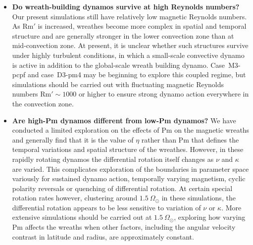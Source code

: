 \begin{itemize}
  \item \textbf{Do wreath-building dynamos survive at high Reynolds  numbers?}  
    Our present simulations still have relatively low
    magnetic Reynolds numbers.  As Rm$'$ is increased, wreathes become
    more complex in spatial and temporal structure and are generally
    stronger in the lower convection zone than at mid-convection
    zone.  At present, it is unclear whether such structures survive
    under highly turbulent conditions, in which a small-scale convective
    dynamo is active in addition to the global-scale wreath building
    dynamo.  Case~M3-pcpf and case~D3-pm4 may be beginning to explore
    this coupled regime, but simulations should be carried out with
    fluctuating magnetic Reynolds numbers Rm$'\sim 1000$ or higher to
    ensure strong dynamo action everywhere in the convection zone.

\clearpage
   \item \textbf{Are high-Pm dynamos different from low-Pm dynamos?}
     We have conducted a limited exploration on the effects of Pm on
     the magnetic wreaths and generally find that it is the value of
     $\eta$ rather than Pm that defines the temporal variations and
     spatial structure of the wreathes.  However, in these rapidly
     rotating dynamos the differential rotation itself changes
     as $\nu$ and $\kappa$ are varied.  This complicates exploration
     of the boundaries in parameter space variously for sustained
     dynamo action, temporally varying magnetism, cyclic polarity
     reversals or quenching of differential rotation.  At certain
     special rotation rates however, clustering around
     $1.5\:\Omega_\odot$ in these simulations, the differential
     rotation appears to be less sensitive to variation of $\nu$ or
     $\kappa$.  More extensive simulations should be carried out at
     $1.5\:\Omega_\odot$, exploring how varying Pm affects the wreaths
     when other factors, including the angular velocity contrast in
     latitude and radius, are approximately constant.


\end{itemize}
